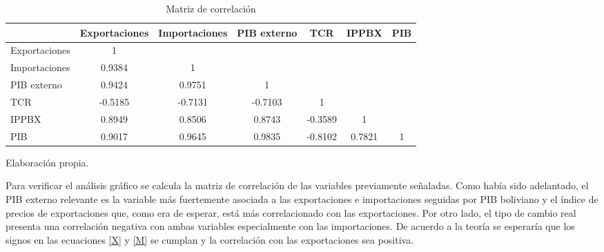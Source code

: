 \documentclass[12pt,letterpaper]{article}
\begin{document}
\begin{table}
\caption{Matriz de correlación}
\begin{center}
\begin{threeparttable}
\begin{tabular}{lcccccc}									
\hline													
\hline												
	&	Exportaciones	&	Importaciones	&	PIB externo	&	TCR	&	IPPBX	&	PIB	\\
\hline													
Exportaciones	&	1	&		&		&		&		&		\\
Importaciones	&	0.9384	&	1	&		&		&		&		\\
PIB externo	&	0.9424	&	0.9751	&	1	&		&		&		\\
TCR	&	-0.5185	&	-0.7131	&	-0.7103	&	1	&		&		\\
IPPBX	&	0.8949	&	0.8506	&	0.8743	&	-0.3589	&	1	&		\\
PIB	&	0.9017	&	0.9645	&	0.9835	&	-0.8102	&	0.7821	&	1	\\
\hline													
\hline									
\end{tabular}							
\begin{tablenotes}
\small
\item Elaboración propia.
\end{tablenotes}	
\end{threeparttable}
\end{center}
\label{Rec}	
\end{table}	

Para verificar el análisis gráfico se calcula la matriz de correlación de las variables previamente señaladas. Como había sido adelantado, el PIB externo relevante es la variable más fuertemente asociada a las exportaciones e importaciones seguidas por PIB boliviano y el índice de precios de exportaciones que, como era de esperar, está más correlacionado con las exportaciones. Por otro lado, el tipo de cambio real presenta una correlación negativa con ambas variables especialmente con las importaciones. De acuerdo a la teoría se esperaría que los signos en las ecuaciones \ref{X} y \ref{M} se cumplan y la correlación con las exportaciones sea positiva.
\end{document}
